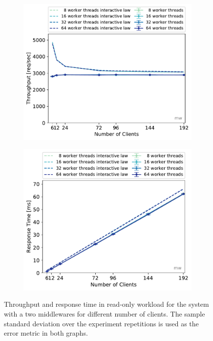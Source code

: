 \documentclass[report.tex]{subfiles}
\begin{document}
\begin{figure}
	\begin{subfigure}[b]{.49\linewidth}
		\centering
		\includegraphics[width=\linewidth]{data/exp32_ro_tp_nc_w.pdf}
	\end{subfigure}\hfill
	\begin{subfigure}[b]{.49\linewidth}
		\centering
		\includegraphics[width=\linewidth]{data/exp32_ro_rt_nc_w.pdf}
	\end{subfigure}%
	\caption{Throughput and response time in read-only workload for the system with a two middlewares for different number of clients. The sample standard deviation over the experiment repetitions is used as the error metric in both graphs.}\label{exp32_ro_tp_nc}
\end{figure}
\end{document}
